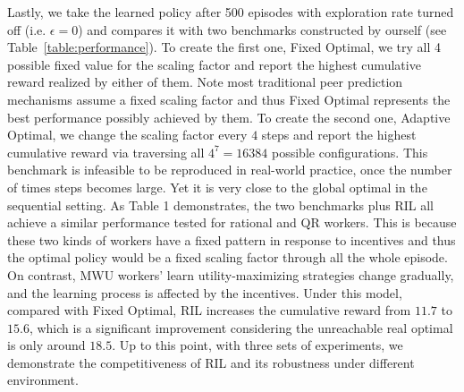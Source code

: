 %

%

Lastly, we take the learned policy after 500 episodes with exploration rate turned off (i.e. $\epsilon =0$) and compares it with two benchmarks constructed by ourself (see Table~\ref{table:performance}). To create the first one, Fixed Optimal, we try all 4 possible fixed value for the scaling factor and report the highest cumulative reward realized by either of them. Note most traditional peer prediction mechanisms assume a fixed scaling factor and thus Fixed Optimal represents the best performance possibly achieved by them.
To create the second one, Adaptive Optimal, we change the scaling factor every $4$ steps and report the highest cumulative reward via traversing all $4^7=16384$ possible configurations. This benchmark is infeasible to be reproduced in real-world practice, once the number of times steps becomes large. Yet it is very close to the global optimal in the sequential setting.
As Table 1 demonstrates, the two benchmarks plus RIL all achieve a similar performance tested for rational and QR workers.
This is because these two kinds of workers have a fixed pattern in response to incentives and thus the optimal policy would be a fixed scaling factor through all the whole episode.
On contrast, MWU workers' learn utility-maximizing strategies change gradually, and the learning process is affected by the incentives. Under this model, compared with Fixed Optimal, RIL increases the cumulative reward from $11.7$ to $15.6$, which is a significant improvement considering the unreachable real optimal is only around $18.5$. Up to this point, with three sets of experiments, we demonstrate the competitiveness of RIL and its robustness under different environment.%

